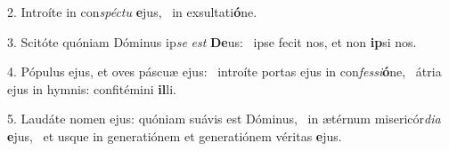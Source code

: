 2. Introíte in con\textit{spéc}\textit{tu} \textbf{e}jus, \ast\  in exsultati\textbf{ó}ne.\

3. Scitóte quóniam Dóminus ip\textit{se} \textit{est} \textbf{De}us: \ast\  ipse fecit nos, et non \textbf{ip}si nos.\

4. Pópulus ejus, et oves páscuæ ejus: \dag\  introíte portas ejus in con\textit{fes}\textit{si}\textbf{ó}ne, \ast\  átria ejus in hymnis: confitémini \textbf{il}li.\

5. Laudáte nomen ejus: quóniam suávis est Dóminus, \dag\  in ætérnum misericór\textit{di}\textit{a} \textbf{e}jus, \ast\  et usque in generatiónem et generatiónem véritas \textbf{e}jus.\

